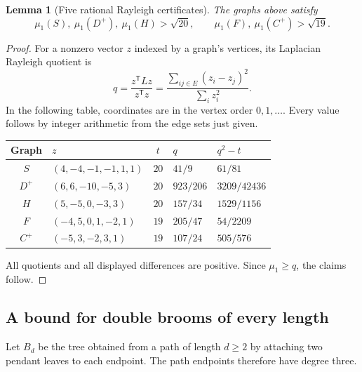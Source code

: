 \documentclass[11pt,a4paper]{article}
\numberwithin{equation}{section}
\newtheorem{lemma}[theorem]{Lemma}
\theoremstyle{remark}
\begin{document}
\begin{lemma}[Five rational Rayleigh certificates]
\label{caz:certificates}
The graphs above satisfy
\[
 \mu_1(S),\ \mu_1(D^+),\ \mu_1(H)>\sqrt{20},
 \qquad
 \mu_1(F),\ \mu_1(C^+)>\sqrt{19}.
\]
\end{lemma}
\begin{proof}
For a nonzero vector $z$ indexed by a graph's vertices, its
Laplacian Rayleigh quotient is
\[
 q=\frac{z^{\mathsf T}Lz}{z^{\mathsf T}z}
   =\frac{\sum_{ij\in E}(z_i-z_j)^2}{\sum_i z_i^2}.
\]
In the following table, coordinates are in the vertex order
$0,1,\ldots$. Every value follows by integer arithmetic from the
edge sets just given.
\begin{center}
\small
\renewcommand{\arraystretch}{1.35}
\begin{tabular}{@{}clcll@{}}
\toprule
Graph & $z$ & $t$ & $q$ & $q^2-t$\\
\midrule
$S$ & $(4,-4,-1,-1,1,1)$ & $20$ & $41/9$ & $61/81$\\
$D^+$ & $(6,6,-10,-5,3)$ & $20$ & $923/206$ & $3209/42436$\\
$H$ & $(5,-5,0,-3,3)$ & $20$ & $157/34$ & $1529/1156$\\
$F$ & $(-4,5,0,1,-2,1)$ & $19$ & $205/47$ & $54/2209$\\
$C^+$ & $(-5,3,-2,3,1)$ & $19$ & $107/24$ & $505/576$\\
\bottomrule
\end{tabular}
\end{center}
All quotients and all displayed differences are positive. Since
$\mu_1\ge q$, the claims follow.
\end{proof}

\subsection{A bound for double brooms of every length}

Let $B_d$ be the tree obtained from a path of length $d\ge2$ by
attaching two pendant leaves to each endpoint. The path endpoints
therefore have degree three.
\end{document}
